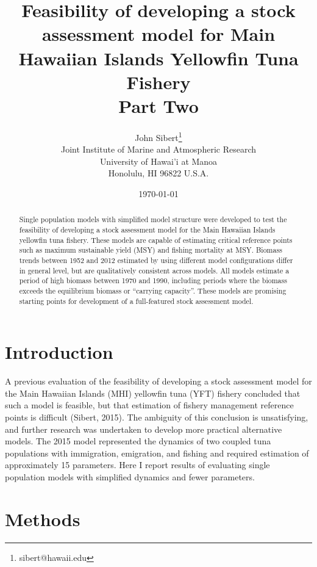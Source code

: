\documentclass[12pt,letterpaper,twoside]{article}
\title{Feasibility of developing a stock assessment model for Main
Hawaiian Islands Yellowfin Tuna Fishery\\
\vspace{2ex}
Part Two}
\author{
John Sibert\thanks{sibert@hawaii.edu}\\
Joint Institute of Marine and Atmospheric Research\\
University of Hawai'i at Manoa\\
Honolulu, HI  96822 U.S.A.\\[0.125in]
\date{\today}
}
\newcommand\doublespacing{\baselineskip=1.6\normalbaselineskip}
\begin{document}
\maketitle


\begin{abstract}
Single population models with simplified model structure
were developed to test the feasibility of developing a stock
assessment model for the Main Hawaiian Islands yellowfin tuna fishery.
These models are capable of
estimating critical reference points such as maximum sustainable
yield (MSY) and fishing mortality at MSY. 
Biomass trends between 1952 and 2012 estimated by using different
model configurations differ in general level, but are
qualitatively consistent across models. All models estimate a period of high
biomass between 1970 and 1990, 
including periods where the biomass exceeds the
equilibrium biomass or ``carrying capacity''. 
These models are
promising starting points for development of a full-featured stock
assessment model.
\end{abstract}


\section{Introduction}
A previous evaluation of the feasibility of developing a
stock assessment model for the Main Hawaiian Islands (MHI) yellowfin
tuna (YFT)
fishery concluded that such a model is feasible, but that estimation of
fishery management reference points is difficult (Sibert, 2015).
The ambiguity of this
conclusion is unsatisfying, and further research was undertaken to
develop more practical alternative models. 
The 2015 model represented
the dynamics of two coupled tuna populations with immigration,
emigration, and fishing and required estimation of approximately 15
parameters. Here I report results of evaluating single
population models with simplified dynamics and fewer parameters.

\section{Methods}
\end{document}
